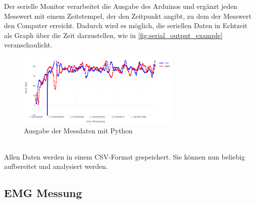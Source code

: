 Der serielle Monitor verarbeitet die Ausgabe des Arduinos und ergänzt jeden Messwert mit einem Zeitstempel, der den Zeitpunkt angibt, zu dem der Messwert den Computer erreicht. 
Dadurch wird es möglich, die seriellen Daten in Echtzeit als Graph über die Zeit darzustellen, wie in \autoref{fig:serial_output_example} veranschaulicht.
\begin{figure}[h!]
    \centering
    \includegraphics[width=0.7\textwidth]{img/serial_output_example.png} %
    \caption{Ausgabe der Messdaten mit Python}
    \label{fig:serial_output_example}
\end{figure}
\\
Allen Daten werden in einem CSV-Format gespeichert.
Sie können nun beliebig aufbereitet und analysiert werden.


\subsection{EMG Messung}

